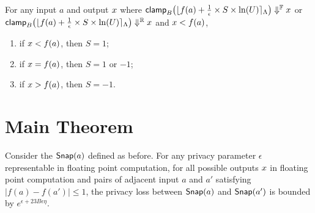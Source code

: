 \documentclass[a4paper,11pt]{article}
\begin{document}
\begin{lem}[sign]
\label{lem:sign}
For any input $a$ and output $x$ where
$\mathsf{clamp}_B \big(
	\lfloor f(a) + \frac{1}{\epsilon} \times S \times \ln (U) \rceil_{\Lambda}
	\big)
	\Downarrow^{\mathbb{F}} x$ 
or $\mathsf{clamp}_B \big(
	\lfloor f(a) + \frac{1}{\epsilon} \times S \times \ln (U) \rceil_{\Lambda}
	\big)
	\Downarrow^{\mathbb{R}} x$ and $x < f(a)$,
%
\begin{enumerate}
	\item if $x < f(a)$, then $S = 1$;
	\item if $x = f(a)$, then $S = 1$ or $ -1$;
	\item if $x > f(a)$, then $S = -1$.
\end{enumerate}
\end{lem}



\newpage
\section{Main Theorem}

\begin{thm}
%
Consider the $\mathsf{Snap}(a)$ defined as before. For any privacy parameter $\epsilon$ representable in floating point computation, for all possible outputs $x$ in floating point computation and pairs of adjacent input $a$ and $a'$ satisfying $|f(a) - f(a')| \leq 1$, the privacy loss between $\mathsf{Snap}(a)$ and $\mathsf{Snap}(a')$ is bounded by $e^{\epsilon + 23 B \epsilon \eta}$.
\end{thm}
\end{document}
